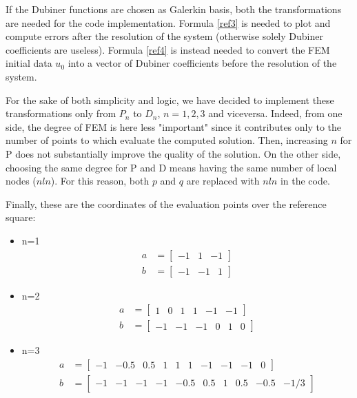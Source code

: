 \documentclass[a4paper]{article}
\begin{document}
	\vspace{5mm}
	\noindent If the Dubiner functions are chosen as Galerkin basis, both the transformations are needed for the code implementation. Formula \ref{ref3} is needed to plot and compute errors after the resolution of the system (otherwise solely Dubiner coefficients are useless). Formula \ref{ref4} is instead needed to convert the FEM initial data $u_0$ into a vector of Dubiner coefficients before the resolution of the system.
	
	\vspace{5mm}
	\noindent For the sake of both simplicity and logic, we have decided to implement these transformations only from $P_n$ to $D_n$, $n=1,2,3$ and viceversa. Indeed, from one side, the degree of FEM is here less "important" since it contributes only to the number of points to which evaluate the computed solution. Then, increasing $n$ for P does not substantially improve the quality of the solution. On the other side, choosing the same degree for P and D means having the same number of local nodes ($nln$). For this reason, both $p$ and $q$ are replaced with $nln$ in the code.	
	
	
	\vspace{5mm}
	\noindent Finally, these are the coordinates of the evaluation points over the reference square:
	\begin{itemize}
	\item n=1
	\begin{equation*}
	\begin{split}
	a &= \begin{bmatrix} -1 & 1& -1\end{bmatrix}\\ b &= \begin{bmatrix} -1 &-1& 1\end{bmatrix}
	\end{split}
	\end{equation*} 
	
	\item n=2
	\begin{equation*}
	\begin{split}
	a &= \begin{bmatrix} 1 &0& 1 &1 &-1& -1\end{bmatrix} \\ b &= \begin{bmatrix}-1& -1& -1& 0& 1& 0\end{bmatrix}
	\end{split}
	\end{equation*} 
	
	\item n=3
	\begin{equation*}
	\begin{split}
	a &= \begin{bmatrix}-1& -0.5& 0.5& 1& 1& 1& -1& -1& -1& 0\end{bmatrix} \\ b&=\begin{bmatrix}-1& -1& -1& -1& -0.5& 0.5& 1& 0.5& -0.5& -1/3\end{bmatrix}
	\end{split}
	\end{equation*}
	\end{itemize}
	
\end{document}
